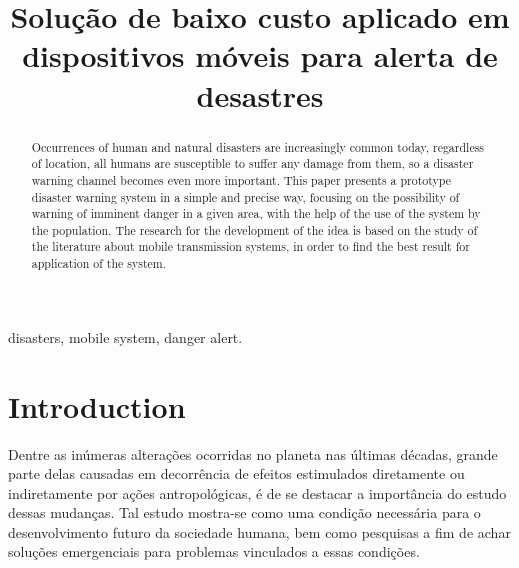 \documentclass[conference]{IEEEtran}
\begin{document}
\title{Solução de baixo custo aplicado em dispositivos móveis para alerta de desastres\\
}

\author{
\and
{}
}

\maketitle

\begin{abstract}
Occurrences of human and natural disasters are increasingly common today, regardless of location, all humans are susceptible to suffer any damage from them, so a disaster warning channel becomes even more important. This paper presents a prototype disaster warning system in a simple and precise way, focusing on the possibility of warning of imminent danger in a given area, with the help of the use of the system by the population. The research for the development of the idea is based on the study of the literature about mobile transmission systems, in order to find the best result for application of the system.
\end{abstract}

\begin{IEEEkeywords}
disasters, mobile system, danger alert.
\end{IEEEkeywords}

\section{Introduction}
Dentre as inúmeras alterações ocorridas no planeta nas últimas décadas, grande parte delas causadas em decorrência de efeitos estimulados diretamente ou indiretamente por ações antropológicas, é de se destacar a importância do estudo dessas mudanças. Tal estudo mostra-se como uma condição necessária para o desenvolvimento futuro da sociedade humana, bem como pesquisas a fim de achar soluções emergenciais para problemas vinculados a essas condições.
\end{document}
